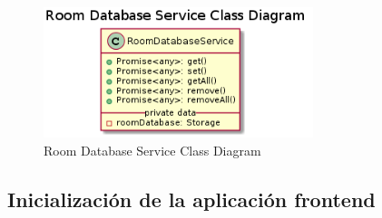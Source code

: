 \begin{figure}[hbt!]
\centering
\includegraphics[height=1.5in]{figures/diagrams/front/architecture/database-service.png}
\caption[app-data]{Room Database Service Class Diagram\footnotemark}
\label{fig:database-service}
\end{figure}

\subsection{Inicialización de la aplicación frontend}
\label{ch:Capitulo4.5.4}

